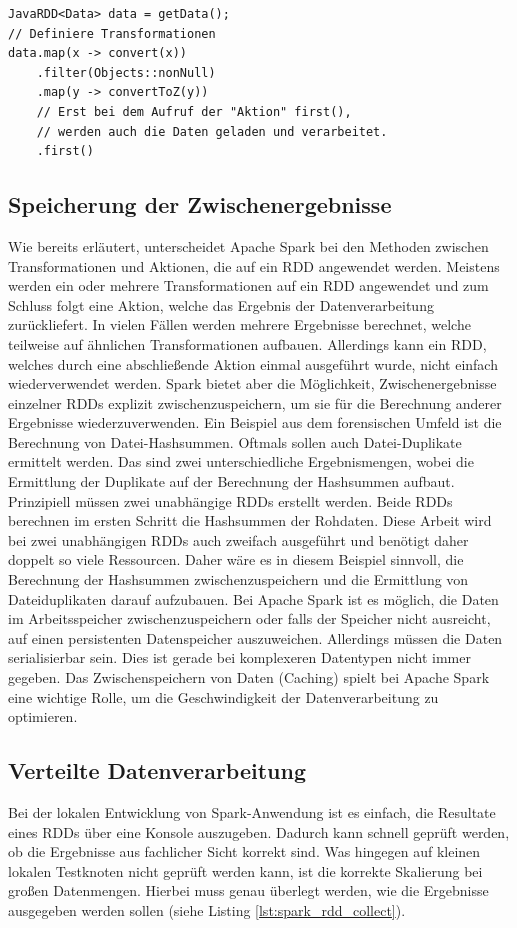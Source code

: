 \begin{lstlisting}[label={lst:spark_lazy_loading},caption= Lazy Loading bei Apache Spark ,captionpos=b,frame=single,style=customjava]
JavaRDD<Data> data = getData();
// Definiere Transformationen
data.map(x -> convert(x))
	.filter(Objects::nonNull)
	.map(y -> convertToZ(y))
	// Erst bei dem Aufruf der "Aktion" first(),
	// werden auch die Daten geladen und verarbeitet.
	.first()
\end{lstlisting}

\subsection*{Speicherung der Zwischenergebnisse}
Wie bereits erläutert, unterscheidet Apache Spark bei den Methoden zwischen Transformationen und Aktionen, die auf ein RDD angewendet werden. Meistens werden ein oder mehrere Transformationen auf ein RDD angewendet und zum Schluss folgt eine Aktion, welche das Ergebnis der Datenverarbeitung zurückliefert. In vielen Fällen werden mehrere Ergebnisse berechnet, welche teilweise auf ähnlichen Transformationen aufbauen. Allerdings kann ein RDD, welches durch eine abschließende Aktion einmal ausgeführt wurde, nicht einfach wiederverwendet werden. Spark bietet aber die Möglichkeit, Zwischenergebnisse einzelner RDDs explizit zwischenzuspeichern, um sie für die Berechnung anderer Ergebnisse wiederzuverwenden. Ein Beispiel aus dem forensischen Umfeld ist die Berechnung von Datei-Hashsummen. Oftmals sollen auch Datei-Duplikate ermittelt werden. Das sind zwei unterschiedliche Ergebnismengen, wobei die Ermittlung der Duplikate auf der Berechnung der Hashsummen aufbaut. Prinzipiell müssen zwei unabhängige RDDs erstellt werden. Beide RDDs berechnen im ersten Schritt die Hashsummen der Rohdaten. Diese Arbeit wird bei zwei unabhängigen RDDs auch zweifach ausgeführt und benötigt daher doppelt so viele Ressourcen. Daher wäre es in diesem Beispiel sinnvoll, die Berechnung der Hashsummen zwischenzuspeichern und die Ermittlung von Dateiduplikaten darauf aufzubauen. Bei Apache Spark ist es möglich, die Daten im Arbeitsspeicher zwischenzuspeichern oder falls der Speicher nicht ausreicht, auf einen persistenten Datenspeicher auszuweichen. Allerdings müssen die Daten serialisierbar sein. Dies ist gerade bei komplexeren Datentypen nicht immer gegeben. Das Zwischenspeichern von Daten (Caching) spielt bei Apache Spark eine wichtige Rolle, um die Geschwindigkeit der Datenverarbeitung zu optimieren.\cite{spark_rdd}

\subsection*{Verteilte Datenverarbeitung}
Bei der lokalen Entwicklung von Spark-Anwendung ist es einfach, die Resultate eines RDDs über eine Konsole auszugeben. Dadurch kann schnell geprüft werden, ob die Ergebnisse aus fachlicher Sicht korrekt sind. Was hingegen auf kleinen lokalen Testknoten nicht geprüft werden kann, ist die korrekte Skalierung bei großen Datenmengen. Hierbei muss genau überlegt werden, wie die Ergebnisse ausgegeben werden sollen (siehe Listing \ref{lst:spark_rdd_collect}). 

